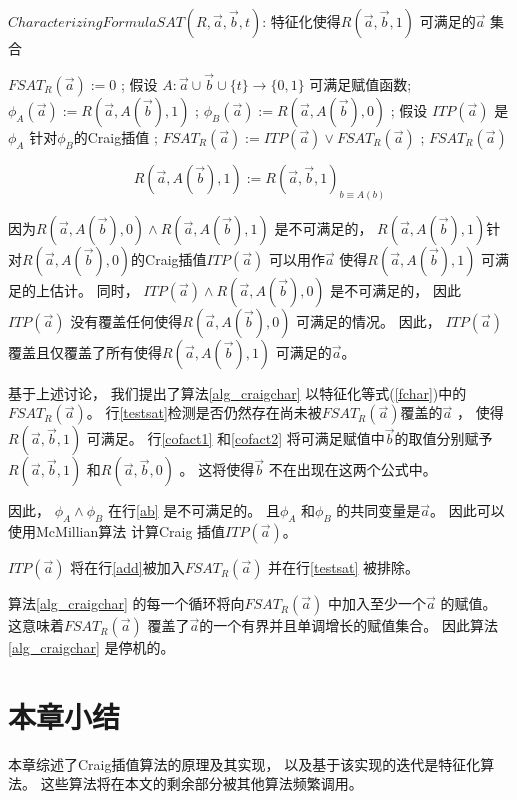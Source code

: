 \begin{algorithm}[t]
\caption{$CharacterizingFormulaSAT(R,\vec{a},\vec{b},t)$: 特征化使得$R(\vec{a},\vec{b},1)$ 可满足的$\vec{a}$ 集合}
\label{alg_craigchar}
\begin{algorithmic}[1]
\label{initcondition}
\STATE $FSAT_R(\vec{a}):= 0$ ;
\label{testsat}
  \STATE 假设 $A:\vec{a}\cup\vec{b}\cup\{t\}\rightarrow \{0,1\}$ 可满足赋值函数;
  \STATE $\phi_A(\vec{a}):= R(\vec{a},A(\vec{b}),1)$ ;
\label{cofact1}
  \STATE $\phi_B(\vec{a}):= R(\vec{a},A(\vec{b}),0)$ ;
\label{cofact2}
  \STATE 假设 $ITP(\vec{a})$ 是$\phi_A$ 针对$\phi_B$的Craig插值 ;
\label{ab}
  \STATE $FSAT_R(\vec{a}):= ITP(\vec{a}) \vee FSAT_R(\vec{a})$ ;
\label{add}
\ENDWHILE
\RETURN $FSAT_R(\vec{a})$
\end{algorithmic}
\end{algorithm}

\begin{equation}
R(\vec{a},A(\vec{b}),1):=R(\vec{a},\vec{b},1)_{b\equiv A(b)}
\end{equation}

因为$R(\vec{a},A(\vec{b}),0)\wedge R(\vec{a},A(\vec{b}),1)$ 是不可满足的，
$R(\vec{a},A(\vec{b}),1)$针对$R(\vec{a},A(\vec{b}),0)$的Craig插值$ITP(\vec{a})$ 可以用作$\vec{a}$ 使得$R(\vec{a},A(\vec{b}),1)$ 可满足的上估计。
同时，
$ITP(\vec{a})\wedge R(\vec{a},A(\vec{b}),0)$ 是不可满足的，
因此$ITP(\vec{a})$ 没有覆盖任何使得$R(\vec{a},A(\vec{b}),0)$ 可满足的情况。
因此，
$ITP(\vec{a})$ 覆盖且仅覆盖了所有使得$R(\vec{a},A(\vec{b}),1)$ 可满足的$\vec{a}$。


基于上述讨论，
我们提出了算法\ref{alg_craigchar} 以特征化等式(\ref{fchar})中的$FSAT_R(\vec{a})$。
行\ref{testsat}检测是否仍然存在尚未被$FSAT_R(\vec{a})$覆盖的$\vec{a}$ ，
使得$R(\vec{a},\vec{b},1)$ 可满足。
行\ref{cofact1} 和\ref{cofact2} 将可满足赋值中$\vec{b}$的取值分别赋予
$R(\vec{a},\vec{b},1)$ 和$R(\vec{a},\vec{b},0)$ 。
这将使得$\vec{b}$ 不在出现在这两个公式中。

因此，
$\phi_A\wedge \phi_B$ 在行\ref{ab} 是不可满足的。
且$\phi_A$ 和$\phi_B$ 的共同变量是$\vec{a}$。
因此可以使用McMillian算法 计算Craig 插值$ITP(\vec{a})$。

$ITP(\vec{a})$ 将在行\ref{add}被加入$FSAT_R(\vec{a})$  并在行\ref{testsat} 被排除。

算法\ref{alg_craigchar} 的每一个循环将向$FSAT_R(\vec{a})$ 中加入至少一个$\vec{a}$ 的赋值。
这意味着$FSAT_R(\vec{a})$ 覆盖了$\vec{a}$的一个有界并且单调增长的赋值集合。
因此算法\ref{alg_craigchar} 是停机的。

\section{本章小结}
本章综述了Craig插值算法的原理及其实现，
以及基于该实现的迭代是特征化算法。
这些算法将在本文的剩余部分被其他算法频繁调用。


